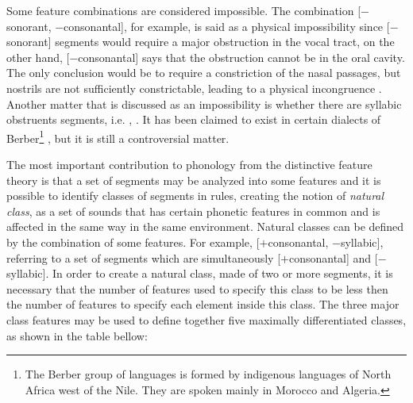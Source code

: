 Some feature combinations are considered impossible. The combination [$-$sonorant, $-$consonantal], for example, is said as a physical impossibility since [$-$sonorant] segments would require a major obstruction in the vocal tract, on the other hand, [$-$consonantal] says that the obstruction cannot be in the oral cavity. The only conclusion would be to require a constriction of the nasal passages, but nostrils are not sufficiently constrictable, leading to a physical incongruence \citep{odden2005}. Another matter that is discussed as an impossibility is whether there are syllabic obstruents segments, i.e. \textipa{[\s{s}]}, \textipa{[\s{k}]}. It has been claimed  to exist in certain dialects of Berber\footnote{The Berber group of languages is formed by indigenous languages of North Africa west of the Nile. They are spoken mainly in Morocco and Algeria.} \citep{odden2005}, but it is still a controversial matter.

The most important contribution to phonology from the distinctive feature theory is that a set of segments may be analyzed into some features and it is possible to identify classes of segments in rules, creating the notion of \textit{natural class}, as a set of sounds that has certain phonetic features in common and is affected in the same way in the same environment. Natural classes can be defined by the combination of some features. For example, [$+$consonantal, $-$syllabic], referring to a set of segments which are simultaneously [$+$consonantal] and [$-$syllabic]. In order to create a natural class,  made of two or more segments, it is necessary that the number of features used to specify this class to be less then the number of features to specify each element inside this class. The three major class features may be used to define together five maximally differentiated classes, as shown in the table bellow:

